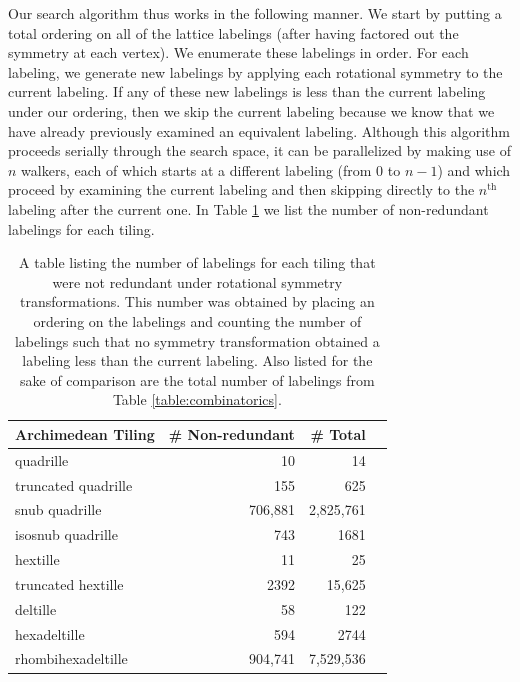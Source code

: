 \documentclass[twocolumn,showpacs,preprintnumbers,amsmath,amssymb,nofootinbib,pra,floatfix]{revtex4-1}
\begin{document}
Our search algorithm thus works in the following manner.  We start by putting a total ordering on all of the lattice labelings (after having factored out the symmetry at each vertex).  We enumerate these labelings in order.  For each labeling, we generate new labelings by applying each rotational symmetry to the current labeling.  If any of these new labelings is less than the current labeling under our ordering, then we skip the current labeling because we know that we have already previously examined an equivalent labeling.  Although this algorithm proceeds serially through the search space, it can be parallelized by making use of $n$ walkers, each of which starts at a different labeling (from $0$ to $n-1$) and which proceed by examining the current labeling and then skipping directly to the $n^{\text{th}}$ labeling after the current one.  In Table \ref{table:count-of-labels-scanned} we list the number of non-redundant labelings for each tiling.

\begin{table}
\begin{tabular}{lrrr} \toprule
Archimedean Tiling & \# Non-redundant & \# Total \\ \midrule
quadrille & 10 & 14\\
truncated quadrille & 155 & 625\\
snub quadrille & 706,881 & 2,825,761\\
isosnub quadrille & 743 & 1681\\
hextille & 11 & 25\\
truncated hextille & 2392 & 15,625\\
deltille & 58 & 122\\
hexadeltille & 594 & 2744\\
rhombihexadeltille & 904,741 & 7,529,536\\ \bottomrule
\end{tabular}
\caption[Number of non-redundant labelings in each tiling]{
\label{table:count-of-labels-scanned}
A table listing the number of labelings for each tiling that were not redundant under rotational symmetry transformations.  This number was obtained by placing an ordering on the labelings and counting the number of labelings such that no symmetry transformation obtained a labeling less than the current labeling.  Also listed for the sake of comparison are the total number of labelings from Table \ref{table:combinatorics}.}
\end{table}
\end{document}
